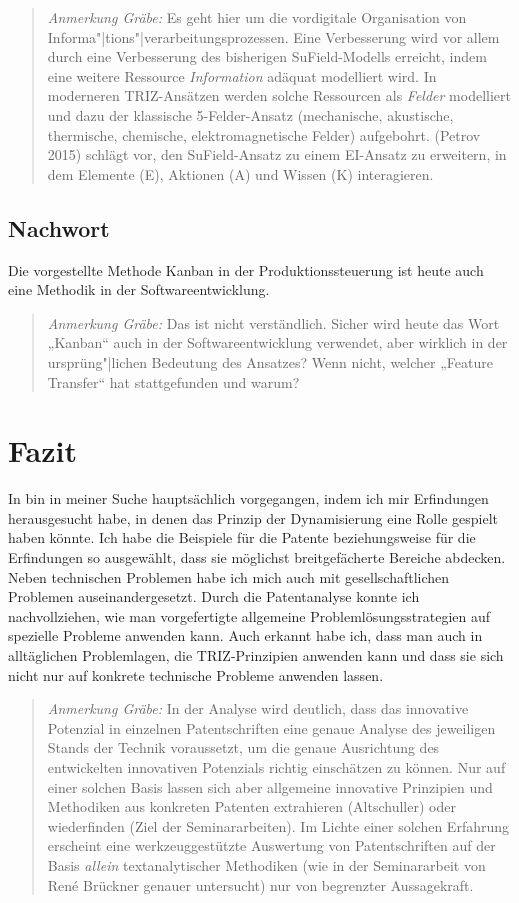 \documentclass[11pt,a4paper]{article}
\newcommand{\HGG}[1]{\begin{quote} \emph{Anmerkung Gräbe:} #1  \end{quote}}
\begin{document}
\HGG{ Es geht hier um die vordigitale Organisation von
  Informa"|tions"|verarbeitungsprozessen.  Eine Verbesserung wird vor allem
  durch eine Verbesserung des bisherigen SuField-Modells erreicht, indem eine
  weitere Ressource \emph{Information} adäquat modelliert wird. In moderneren
  TRIZ-Ansätzen werden solche Ressourcen als \emph{Felder} modelliert und dazu
  der klassische 5-Felder-Ansatz (mechanische, akustische, thermische,
  chemische, elektromagnetische Felder) aufgebohrt.  (Petrov 2015) schlägt
  vor, den SuField-Ansatz zu einem EI-Ansatz zu erweitern, in dem Elemente
  (E), Aktionen (A) und Wissen (K) interagieren.  }


\subsection{Nachwort}
Die vorgestellte Methode Kanban in der Produktionssteuerung ist heute auch
eine Methodik in der Softwareentwicklung.

\HGG{Das ist nicht verständlich.  Sicher wird heute das Wort „Kanban“ auch in
  der Softwareentwicklung verwendet, aber wirklich in der ursprüng"|lichen
  Bedeutung des Ansatzes? Wenn nicht, welcher „Feature Transfer“ hat
  stattgefunden und warum?}

\section{Fazit}
In bin in meiner Suche hauptsächlich vorgegangen, indem ich mir Erfindungen
herausgesucht habe, in denen das Prinzip der Dynamisierung eine Rolle gespielt
haben könnte. Ich habe die Beispiele für die Patente beziehungsweise für die
Erfindungen so ausgewählt, dass sie möglichst breitgefächerte Bereiche
abdecken. Neben technischen Problemen habe ich mich auch mit
gesellschaftlichen Problemen auseinandergesetzt.  Durch die Patentanalyse
konnte ich nachvollziehen, wie man vorgefertigte allgemeine
Problemlösungsstrategien auf spezielle Probleme anwenden kann.  Auch erkannt
habe ich, dass man auch in alltäglichen Problemlagen, die TRIZ-Prinzipien
anwenden kann und dass sie sich nicht nur auf konkrete technische Probleme
anwenden lassen.

\HGG{In der Analyse wird deutlich, dass das innovative Potenzial in einzelnen
  Patentschriften eine genaue Analyse des jeweiligen Stands der Technik
  voraussetzt, um die genaue Ausrichtung des entwickelten innovativen
  Potenzials richtig einschätzen zu können.  Nur auf einer solchen Basis
  lassen sich aber allgemeine innovative Prinzipien und Methodiken aus
  konkreten Patenten extrahieren (Altschuller) oder wiederfinden (Ziel der
  Seminararbeiten).  Im Lichte einer solchen Erfahrung erscheint eine
  werkzeuggestützte Auswertung von Patentschriften auf der Basis \emph{allein}
  textanalytischer Methodiken (wie in der Seminararbeit von René Brückner
  genauer untersucht) nur von begrenzter Aussagekraft. }
\end{document}
